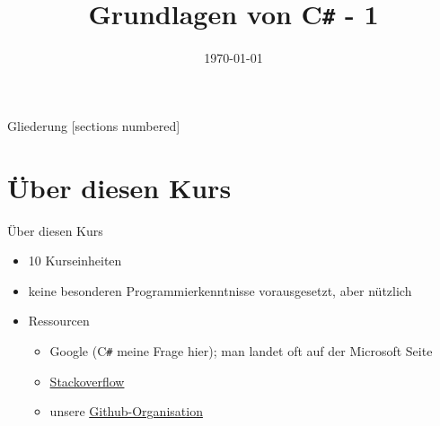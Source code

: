 



\title{Grundlagen von C\texttt{\#} - 1}
\date{\today}




\maketitle

\begin{frame}{Gliederung}
	[sections numbered]
	\tableofcontents
\end{frame}

\section{Über diesen Kurs}
\begin{frame}{Über diesen Kurs}
	\begin{itemize}
		\item 10 Kurseinheiten
		\item keine besonderen Programmierkenntnisse vorausgesetzt, aber nützlich
		\item Ressourcen
		\begin{itemize}
			\item Google (C\texttt{\#} meine Frage hier); man landet oft auf der Microsoft Seite
			\item \href{http://stackoverflow.com/}{Stackoverflow}
			\item unsere \href{https://github.com/fsr}{Github-Organisation}
		\end{itemize}
	\end{itemize}
\end{frame}

